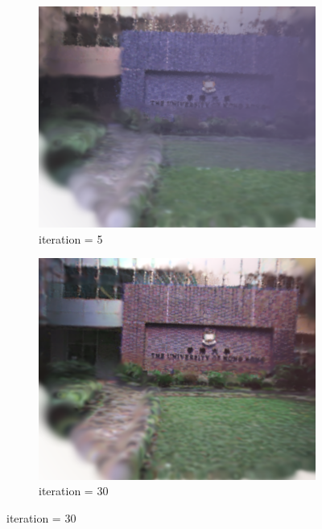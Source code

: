 \documentclass[lettersize,journal]{IEEEtran}
\begin{document}
\begin{figure}
    \begin{subfigure}{0.15\textwidth}
        \includegraphics[width=\linewidth]{image/runtime/5.png}
        \caption{iteration = 5}
        \label{fig:runtime5}
    \end{subfigure}
    \hspace{0.0001\textwidth} %
    \begin{subfigure}{0.15\textwidth}
        \includegraphics[width=\linewidth]{image/runtime/30.png}
        \caption{iteration = 30}
        \label{fig:runtime30}

\end{subfigure}
\end{figure}
\end{document}
